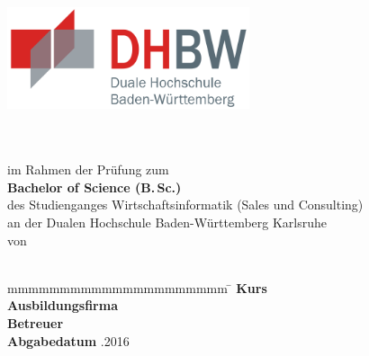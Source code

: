 \thispagestyle{plain}

\begin{titlepage}
	
	\centering\includegraphics[height=3cm]{Abbildungen/dhbw}	
	\enlargethispage{20mm}
	
	\begin{center}
		\vspace*{12mm}	{\LARGE\bf \titel }\\
		\vspace*{12mm}	{\large\bf \art}\\
		\vspace*{12mm}	im Rahmen der Prüfung zum\\
		\vspace*{3mm} 	\textbf{Bachelor of Science (B.\,Sc.)}\\
		\vspace*{12mm}	des Studienganges Wirtschaftsinformatik (Sales und Consulting)\\
		\vspace*{3mm} 	an der Dualen Hochschule Baden-Württemberg Karlsruhe\\
		\vspace*{12mm}	von\\
		\vspace*{3mm} 	{\large\bf \verfasser}\\
		
	\end{center}
	\vfill
	\begin{spacing}{1.7}
		\begin{center}\parbox{0cm}{
				\begin{tabbing}
					mmmmmmmmmmmmmmmmmmmmm \=  \kill
					\textbf{Kurs}  				   \>  \kurs\\
					\textbf{Ausbildungsfirma}      \>  \ausbildungsbetrieb\\
					\textbf{Betreuer}              \>  \betreuer\\
					\textbf{Abgabedatum}		   .2016 
				\end{tabbing}
			}
		\end{center}
	\end{spacing}
	\vfill
\end{titlepage}